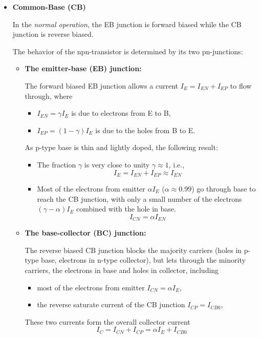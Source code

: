 \begin{itemize}
\item {\bf Common-Base (CB)}

In the {\em normal operation}, the EB junction is forward biased while the 
CB junction is reverse biased.





The behavior of the npn-transistor is determined by its two pn-junctions:
\begin{itemize}
\item {\bf The emitter-base (EB) junction:}

The forward biased EB junction allows a current $I_E=I_{EN}+I_{EP}$ to flow 
through, where 
\begin{itemize}
\item $I_{EN}=\gamma I_E$ is due to electrons from E to B, 
\item $I_{EP}=(1-\gamma) I_E$ is due to the holes from B to E. 
\end{itemize}
As p-type base is thin and lightly doped, the following result:
\begin{itemize}
\item The fraction $\gamma$ is very close to unity $\gamma \approx 1$, i.e.,
\[	I_E=I_{EN}+I_{EP}\approx I_{EN}	\]
\item Most of the electrons from emitter $\alpha I_E$ ($\alpha \approx 0.99$) 
go through base to reach the CB junction, with only a small number of the 
electrons $(\gamma-\alpha)I_E$ combined with the hole in base.
\[	I_{CN}=\alpha I_{EN}	\]
\end{itemize}

\item {\bf The base-collector (BC) junction:}

The reverse biased CB junction blocks the majority carriers (holes in
p-type base, electrons in n-type collector), but lets through the 
minority carriers, the electrons in base and holes in collector, including
\begin{itemize}
\item most of the electrons from emitter $I_{CN}=\alpha I_E$,
\item the reverse saturate current of the CB junction $I_{CP}=I_{CB0}$,
\end{itemize}
These two currents form the overall collector current
\[	I_C=I_{CN}+I_{CP}=\alpha I_E+I_{CB0}	\]


\end{itemize}
\end{itemize}

